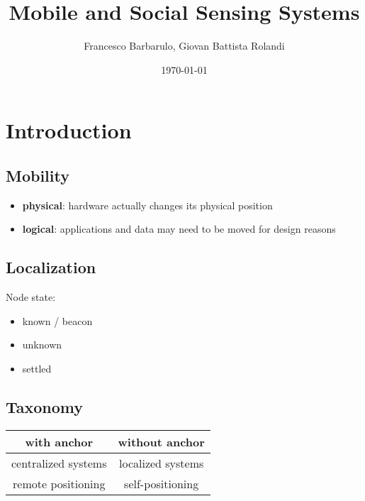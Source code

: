\documentclass[a4paper,12pt]{article}
\title{Mobile and Social Sensing Systems}
\author{Francesco Barbarulo, Giovan Battista Rolandi}
\date{\monthyeardate\today}
\begin{document}

\maketitle
{}

\tableofcontents

\newpage


\section{Introduction}
\subsection{Mobility}
\begin{itemize}
  \item \textbf{physical}: hardware actually changes its physical position
  \item \textbf{logical}: applications and data may need to be moved for design reasons
\end{itemize}

\subsection{Localization}
Node state:
\begin{itemize}
  \item known / beacon
  \item unknown
  \item settled
\end{itemize}

\subsection{Taxonomy}
\begin{tabular}{| c | c |}\hline
with anchor & without anchor \\ \hline
centralized systems & localized systems \\ \hline
remote positioning & self-positioning \\ \hline
\end{tabular}
\end{document}
